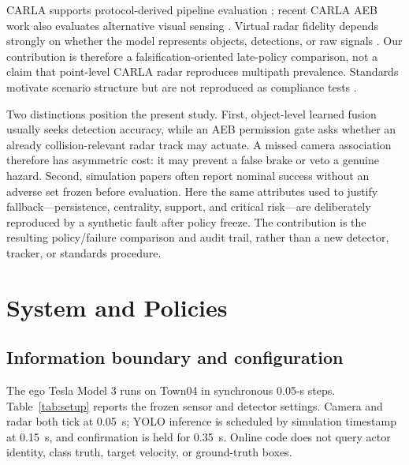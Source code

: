 \documentclass[conference]{IEEEtran}
\begin{document}
CARLA supports protocol-derived pipeline evaluation
\cite{gomez2022carla}; recent CARLA AEB work also evaluates alternative visual
sensing \cite{feng2025dvs}. Virtual radar fidelity depends strongly on whether
the model represents objects, detections, or raw signals
\cite{magosi2022radar}. Our contribution is therefore a falsification-oriented
late-policy comparison, not a claim that point-level CARLA radar reproduces
multipath prevalence. Standards motivate scenario structure but are not
reproduced as compliance tests \cite{iso15623,euroncap_aeb}.

Two distinctions position the present study. First, object-level learned fusion
usually seeks detection accuracy, while an AEB permission gate asks whether an
already collision-relevant radar track may actuate. A missed camera association
therefore has asymmetric cost: it may prevent a false brake or veto a genuine
hazard. Second, simulation papers often report nominal success without an
adverse set frozen before evaluation. Here the same attributes used to justify
fallback---persistence, centrality, support, and critical risk---are deliberately
reproduced by a synthetic fault after policy freeze. The contribution is the
resulting policy/failure comparison and audit trail, rather than a new detector,
tracker, or standards procedure.

\section{System and Policies}
\subsection{Information boundary and configuration}
The ego Tesla Model 3 runs on Town04 in synchronous 0.05-s steps. Table~\ref{tab:setup}
reports the frozen sensor and detector settings. Camera and radar both tick at
0.05~s; YOLO inference is scheduled by simulation timestamp at 0.15~s, and
confirmation is held for 0.35~s. Online code does not query actor identity,
class truth, target velocity, or ground-truth boxes.
\end{document}
